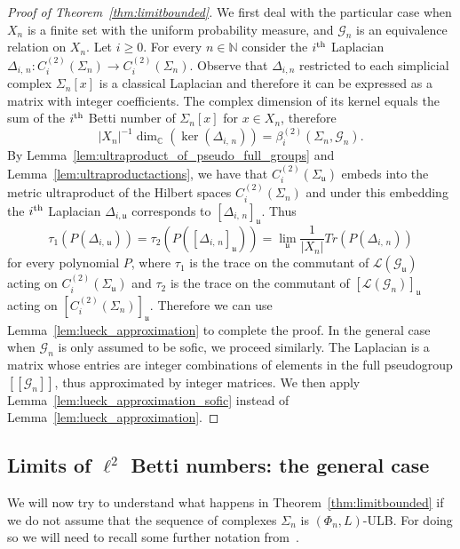 \documentclass[10pt]{amsart}
\theoremstyle{definition}
\newcommand{\Nmath}{\mathbb{N}}
\newcommand{\Cmath}{\mathbb{C}}
\newcommand{\LL}{\mathcal{L}}
\newcommand{\cg}{\mathcal{G}}
\newcommand{\ul}{\mathfrak{u}}
\begin{document}
\begin{proof}[Proof of Theorem~\ref{thm:limitbounded}]
We first deal with the particular case when $X_n$ is a finite set with the uniform probability measure, and $\cg_n$ is an equivalence relation on $X_n$. Let $i \geq 0$. For every $n\in\Nmath$ consider the $i^{\rm th}$ Laplacian $\Delta_{i,\,n}: C_{i}^{(2)}(\Sigma_n)\rightarrow C_{i}^{(2)}(\Sigma_n)$. Observe that $\Delta_{i,n}$ restricted to each simplicial complex $\Sigma_n[x]$ is a classical Laplacian and therefore it can be expressed as a matrix with integer coefficients. The complex dimension of its kernel equals the sum of the $i^{\rm th}$ Betti number of $\Sigma_n[x]$ for $x\in X_n$, therefore
\[
|X_n|^{-1}\dim_{\Cmath}\left(\ker\left(\Delta_{i,\,n}\right)\right)=\beta^{(2)}_i\left(\Sigma_n,\cg_n\right).
\]
By Lemma~\ref{lem:ultraproduct_of_pseudo_full_groups} and Lemma~\ref{lem:ultraproductactions}, we have that $C_{i}^{(2)}(\Sigma_\ul)$ embeds into the metric ultraproduct of the Hilbert spaces $C_{i}^{(2)}(\Sigma_n)$ and under this embedding the $i^{\rm th}$ Laplacian $\Delta_{i,\ul}$ corresponds to $[\Delta_{i,\,n}]_\ul$. Thus
\[
\tau_1\left(P\left(\Delta_{i,\,\ul}\right)\right)= \tau_2\left(P\left([\Delta_{i,\,n}]_\ul\right)\right)= \lim_\ul \frac 1 {\vert X_n\vert} Tr\left(P\left(\Delta_{i,\,n}\right)\right)
\]
for every polynomial $P$, where $\tau_1$ is the trace on the commutant of $\LL(\cg_\ul)$ acting on $C_{i}^{(2)}(\Sigma_\ul)$ and $\tau_2$ is the trace on the commutant of $[\LL(\cg_n)]_\ul$ acting on $[C_{i}^{(2)}(\Sigma_n)]_\ul$. Therefore we can use Lemma~\ref{lem:lueck_approximation} to complete the proof. In the general case when $\cg_n$ is only assumed to be sofic, we proceed similarly. The Laplacian is a matrix whose entries are integer combinations of elements in the full pseudogroup $[[\cg_n]]$, thus approximated by integer matrices. We then apply Lemma~\ref{lem:lueck_approximation_sofic} instead of Lemma~\ref{lem:lueck_approximation}.
\end{proof}

\subsection{\texorpdfstring{Limits of $\ell^2$ Betti numbers: the general case}{Limits of L2 Betti numbers: the general case}}

We will now try to understand what happens in Theorem~\ref{thm:limitbounded} if we do not assume that the sequence of complexes $\Sigma_n$ is $(\Phi_n,L)$-ULB. For doing so we will need to recall some further notation from~\cite{gab_ihes}.
\end{document}
